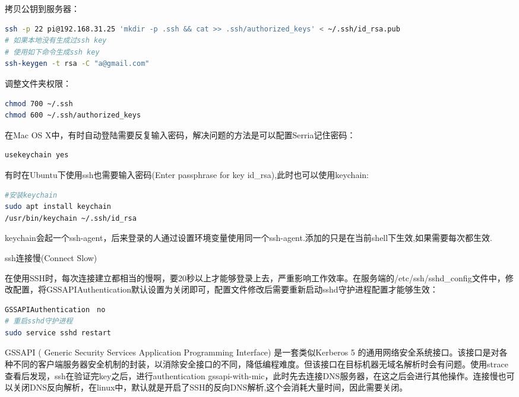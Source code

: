 \documentclass[12pt]{book}
\makeatletter
\numberwithin{dummy}{section}
\theoremstyle{ocrenumbox}
\theoremstyle{blacknumex}
\theoremstyle{blacknumbox}
\theoremstyle{ocrenum}
\renewcommand{\subsection}{\@startsection {subsection}{2}{\z@}
	{-3ex \@plus -0.1ex \@minus -.4ex}
	{0.5ex \@plus.2ex }
	{\normalfont\sffamily\bfseries}}
\makeatother
\begin{document}
拷贝公钥到服务器：

\begin{lstlisting}[language=Bash]
ssh -p 22 pi@192.168.31.25 'mkdir -p .ssh && cat >> .ssh/authorized_keys' < ~/.ssh/id_rsa.pub
# 如果本地没有生成过ssh key
# 使用如下命令生成ssh key
ssh-keygen -t rsa -C "a@gmail.com"
\end{lstlisting}

调整文件夹权限：

\begin{lstlisting}[language=Bash]
chmod 700 ~/.ssh
chmod 600 ~/.ssh/authorized_keys 
\end{lstlisting}

在Mac OS X中，有时自动登陆需要反复输入密码，解决问题的方法是可以配置Serria记住密码：

\begin{lstlisting}[language=Bash]
usekeychain yes
\end{lstlisting}

有时在Ubuntu下使用ssh也需要输入密码(Enter passphrase for key id\_rsa),此时也可以使用keychain:

\begin{lstlisting}[language=Bash]
#安装keychain
sudo apt install keychain
/usr/bin/keychain ~/.ssh/id_rsa
\end{lstlisting}

keychain会起一个ssh-agent，后来登录的人通过设置环境变量使用同一个ssh-agent.添加的只是在当前shell下生效,如果需要每次都生效.



\subsection{ssh连接慢(Connect Slow)}

在使用SSH时，每次连接建立都相当的慢啊，要20秒以上才能够登录上去，严重影响工作效率。在服务端的/etc/ssh/sshd\_config文件中，修改配置，将GSSAPIAuthentication默认设置为关闭即可，配置文件修改后需要重新启动sshd守护进程配置才能够生效：

\begin{lstlisting}[language=Bash]
GSSAPIAuthentication　no
# 重启sshd守护进程
sudo service sshd restart
\end{lstlisting}

GSSAPI ( Generic Security Services Application Programming Interface) 是一套类似Kerberos 5 的通用网络安全系统接口。该接口是对各种不同的客户端服务器安全机制的封装，以消除安全接口的不同，降低编程难度。但该接口在目标机器无域名解析时会有问题。使用strace查看后发现，ssh在验证完key之后，进行authentication gssapi-with-mic，此时先去连接DNS服务器，在这之后会进行其他操作。连接慢也可以关闭DNS反向解析，在linux中，默认就是开启了SSH的反向DNS解析,这个会消耗大量时间，因此需要关闭\cite{book-wiresharkanalysis}。
\end{document}
